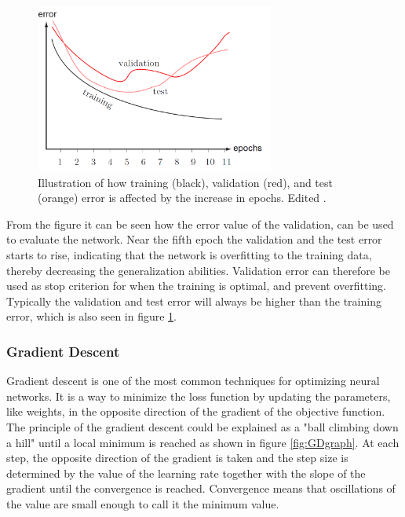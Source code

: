 \begin{figure} [H]
\centering
\includegraphics[width=0.7\textwidth]{figures/learningCurves}
\caption{Illustration of how training (black), validation (red), and test (orange) error is affected by the increase in epochs. Edited \citep{Duda2000}.}
\label{fig:learningCurve}
\end{figure}

\noindent
From the figure it can be seen how the error value of the validation, can be used to evaluate the network. 
Near the fifth epoch the validation and the test error starts to rise, indicating that the network is overfitting to the training data, thereby decreasing the generalization abilities. 
Validation error can therefore be used as stop criterion for when the training is optimal, and prevent overfitting. 
Typically the validation and test error will always be higher than the training error, which is also seen in figure \ref{fig:learningCurve}.\citep{Duda2000}

\subsubsection{Gradient Descent} \label{sec:optimizers}
Gradient descent is one of the most common techniques for optimizing neural networks. It is a way to minimize the loss function by updating the parameters, like weights, in the opposite direction of the gradient of the objective function.\citep{Ruder2016} The principle of the gradient descent could be explained as a "ball climbing down a hill" until a local minimum is reached as shown in figure \ref{fig:GDgraph}. At each step, the opposite direction of the gradient is taken and the step size is determined by the value of the learning rate together with the slope of the gradient until the convergence is reached. Convergence means that oscillations of the value are small enough to call it the minimum value.\citep{Raschka2016}

